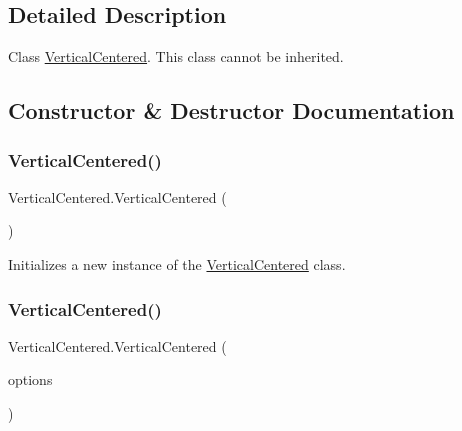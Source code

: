 \subsection{Detailed Description}
Class \hyperlink{class_vertical_centered}{Vertical\+Centered}. This class cannot be inherited. 



\subsection{Constructor \& Destructor Documentation}
\mbox{\label{class_vertical_centered_a01ae1291cf33dce502e25a2664ba1373}} 
\subsubsection{\texorpdfstring{Vertical\+Centered()}{VerticalCentered()}\hspace{0.1cm}{\footnotesize\ttfamily [1/2]}}
{\footnotesize\ttfamily Vertical\+Centered.\+Vertical\+Centered (\begin{DoxyParamCaption}{ }\end{DoxyParamCaption})\hspace{0.3cm}{\ttfamily [inline]}}



Initializes a new instance of the \hyperlink{class_vertical_centered}{Vertical\+Centered} class. 

\mbox{\label{class_vertical_centered_abe07e0a533721ac8d5675297eeec1a28}} 
\subsubsection{\texorpdfstring{Vertical\+Centered()}{VerticalCentered()}\hspace{0.1cm}{\footnotesize\ttfamily [2/2]}}
{\footnotesize\ttfamily Vertical\+Centered.\+Vertical\+Centered (\begin{DoxyParamCaption}\item[{params G\+U\+I\+Layout\+Option \mbox{[}$\,$\mbox{]}}]{options }\end{DoxyParamCaption})\hspace{0.3cm}{\ttfamily [inline]}}



